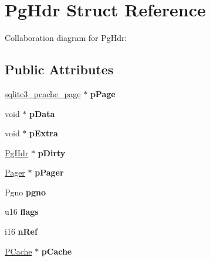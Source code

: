 \hypertarget{structPgHdr}{}\section{Pg\+Hdr Struct Reference}
\label{structPgHdr}


Collaboration diagram for Pg\+Hdr\+:
\subsection*{Public Attributes}
\begin{DoxyCompactItemize}
\item 
\hyperlink{structsqlite3__pcache__page}{sqlite3\+\_\+pcache\+\_\+page} $\ast$ {\bfseries p\+Page}\hypertarget{structPgHdr_aa5645976ba0634993a7304dce8856c8b}{}\label{structPgHdr_aa5645976ba0634993a7304dce8856c8b}

\item 
void $\ast$ {\bfseries p\+Data}\hypertarget{structPgHdr_a0f9f2ac8492c0cdad5898036db20b798}{}\label{structPgHdr_a0f9f2ac8492c0cdad5898036db20b798}

\item 
void $\ast$ {\bfseries p\+Extra}\hypertarget{structPgHdr_a8ff7430ed04077f1ae20d10801968164}{}\label{structPgHdr_a8ff7430ed04077f1ae20d10801968164}

\item 
\hyperlink{structPgHdr}{Pg\+Hdr} $\ast$ {\bfseries p\+Dirty}\hypertarget{structPgHdr_a7732b1c0f19d9555ac93d4879fc95bbd}{}\label{structPgHdr_a7732b1c0f19d9555ac93d4879fc95bbd}

\item 
\hyperlink{structPager}{Pager} $\ast$ {\bfseries p\+Pager}\hypertarget{structPgHdr_aaa4879a9510c8a819a1e10a8ee21495b}{}\label{structPgHdr_aaa4879a9510c8a819a1e10a8ee21495b}

\item 
Pgno {\bfseries pgno}\hypertarget{structPgHdr_ab6e2223e410acf9bae7f12f1b1293589}{}\label{structPgHdr_ab6e2223e410acf9bae7f12f1b1293589}

\item 
u16 {\bfseries flags}\hypertarget{structPgHdr_a8ef58380f7e04f1e3c76fa208e227f95}{}\label{structPgHdr_a8ef58380f7e04f1e3c76fa208e227f95}

\item 
i16 {\bfseries n\+Ref}\hypertarget{structPgHdr_ac68c685d117788c18849e8853dd419d5}{}\label{structPgHdr_ac68c685d117788c18849e8853dd419d5}

\item 
\hyperlink{structPCache}{P\+Cache} $\ast$ {\bfseries p\+Cache}\hypertarget{structPgHdr_a557aeaddd1b0805815ce06f1bfd27782}{}\label{structPgHdr_a557aeaddd1b0805815ce06f1bfd27782}


\end{DoxyCompactItemize}
